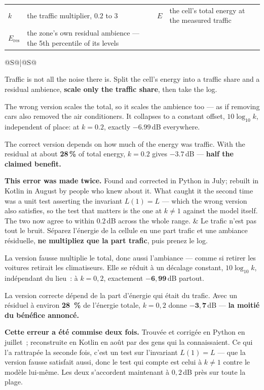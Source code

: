 \documentclass[10pt,a4paper]{article}
\makeatletter
\newenvironment{where}{%
  \par\vspace{.5mm}{\footnotesize\color{muted}\textsc{where}}\par\vspace{.8mm}
  \begin{tabular}{@{}p{20mm}p{62mm}@{\hspace{6mm}}p{20mm}p{62mm}@{}}
}{%
  \end{tabular}\par\vspace{2mm}}
\newenvironment{say}{%
  \begin{tabular}{@{}S@{\hspace{5mm}}|@{\hspace{5mm}}S@{}}
}{%
  \end{tabular}\par}
\newcommand{\must}[1]{{\color{good}\textbf{#1}}}
\newcommand{\care}[1]{{\color{warn}\textbf{#1}}}
\makeatother
\begin{document}
\begin{where}
  $k$ & the traffic multiplier, $0.2$ to $3$ &
  $E$ & the cell's total energy at the measured traffic \\
  $E_\mathrm{res}$ & the zone's own residual ambience --- the 5th percentile of
    its levels &
  & \\
\end{where}
\begin{say}
Traffic is not all the noise there is. Split the cell's energy into a traffic
share and a residual ambience, \must{scale only the traffic share}, then take the
log.

The wrong version scales the total, so it scales the ambience too --- as if
removing cars also removed the air conditioners. It collapses to a constant
offset, $10\log_{10}k$, independent of place: at $k = 0.2$, exactly
$\mathbf{-6.99}$\,dB everywhere.

The correct version depends on how much of the energy was traffic. With the
residual at about \care{28\,\%} of total energy, $k=0.2$ gives $\mathbf{-3.7}$\,dB
--- \must{half the claimed benefit.}

\must{This error was made twice.} Found and corrected in Python in July; rebuilt
in Kotlin in August by people who knew about it. What caught it the second time
was a unit test asserting the invariant $L(1) = L$ --- which the wrong version
also satisfies, so the test that matters is the one at $k \neq 1$ against the
model itself. The two now agree to within $0.2$\,dB across the whole range.
&
Le trafic n'est pas tout le bruit. Séparez l'énergie de la cellule en une part
trafic et une ambiance résiduelle, \must{ne multipliez que la part trafic}, puis
prenez le log.

La version fausse multiplie le total, donc aussi l'ambiance --- comme si retirer
les voitures retirait les climatiseurs. Elle se réduit à un décalage constant,
$10\log_{10}k$, indépendant du lieu~: à $k = 0,2$, exactement
$\mathbf{-6,99}$\,dB partout.

La version correcte dépend de la part d'énergie qui était du trafic. Avec un
résiduel à environ \care{28~\%} de l'énergie totale, $k=0,2$ donne
$\mathbf{-3,7}$\,dB --- \must{la moitié du bénéfice annoncé.}

\must{Cette erreur a été commise deux fois.} Trouvée et corrigée en Python en
juillet~; reconstruite en Kotlin en août par des gens qui la connaissaient. Ce qui
l'a rattrapée la seconde fois, c'est un test sur l'invariant $L(1) = L$ --- que la
version fausse satisfait aussi, donc le test qui compte est celui à $k \neq 1$
contre le modèle lui-même. Les deux s'accordent maintenant à $0,2$\,dB près sur
toute la plage.
\end{say}
\end{document}
